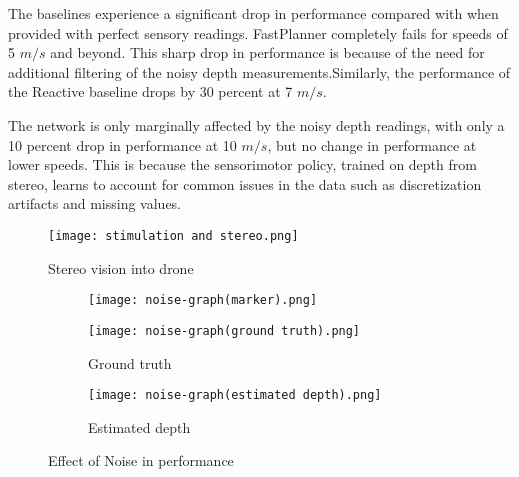 The baselines experience a significant drop in performance compared with when provided with perfect sensory readings. FastPlanner\cite{fastPlanner} completely fails for speeds of 5 $m/s$ and beyond. This sharp drop in performance is because of the need for additional filtering of the noisy depth measurements.Similarly, the performance of the Reactive baseline drops by 30 percent at 7 $m/s$.

The network is only marginally affected by the noisy depth readings, with only a 10 percent drop in performance at 10 $m/s$, but no change in performance at lower speeds. This is because the sensorimotor policy, trained on depth from stereo, learns to account for common issues in the data such as discretization
artifacts and missing values. 

\begin{figure}[!h]
	\centering
	\texttt{[image: stimulation and stereo.png]}
	\caption{Stereo vision into drone}
	\label{fig:sterio-vision}
\end{figure}

\begin{figure}[!h]
	\centering
	\begin{subfigure}[b]{0.75\textwidth}
		\texttt{[image: noise-graph(marker).png]}
	\end{subfigure}
	\begin{subfigure}[b]{0.48\textwidth}
		\texttt{[image: noise-graph(ground truth).png]}
		\caption{Ground truth}
	\end{subfigure}
	\begin{subfigure}[b]{0.48\textwidth}
		\texttt{[image: noise-graph(estimated depth).png]}
		\caption{Estimated depth}
	\end{subfigure}
	\caption{Effect of Noise in performance}
	\label{fig:noise-graph}
\end{figure}
